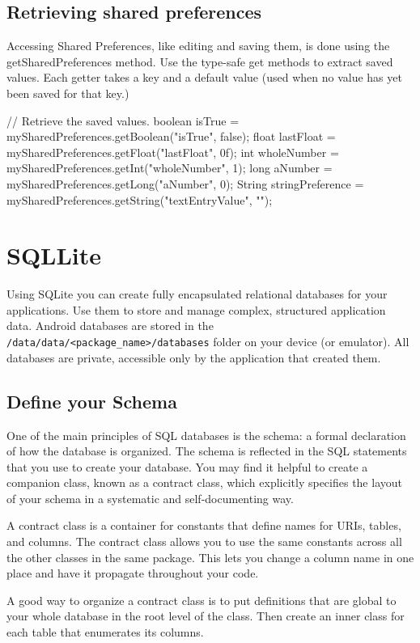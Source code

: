\subsection{Retrieving shared preferences}
Accessing Shared Preferences, like editing and saving them, is done using the getSharedPreferences method. Use the type-safe get methods to extract saved values. Each getter takes a key and a default value (used when no value has yet been saved for that key.)

\begin{android}
// Retrieve the saved values.
boolean isTrue = mySharedPreferences.getBoolean("isTrue", false);
float lastFloat = mySharedPreferences.getFloat("lastFloat", 0f);
int wholeNumber = mySharedPreferences.getInt("wholeNumber", 1);
long aNumber = mySharedPreferences.getLong("aNumber", 0);
String stringPreference =
mySharedPreferences.getString("textEntryValue", "");
\end{android}

\section{SQLLite}
Using SQLite you can create fully encapsulated relational databases for your applications. Use them to store and manage complex, structured application data. Android databases are stored in the \texttt{/data/data/<package\_name>/databases} folder on your device (or emulator). All databases are private, accessible only by the application that created them.

\subsection{Define your Schema}
One of the main principles of SQL databases is the schema: a formal declaration of how the database is organized. The schema is reflected in the SQL statements that you use to create your database. You may find it helpful to create a companion class, known as a contract class, which explicitly specifies the layout of your schema in a systematic and self-documenting way.

A contract class is a container for constants that define names for URIs, tables, and columns. The contract class allows you to use the same constants across all the other classes in the same package. This lets you change a column name in one place and have it propagate throughout your code.

A good way to organize a contract class is to put definitions that are global to your whole database in the root level of the class. Then create an inner class for each table that enumerates its columns.

